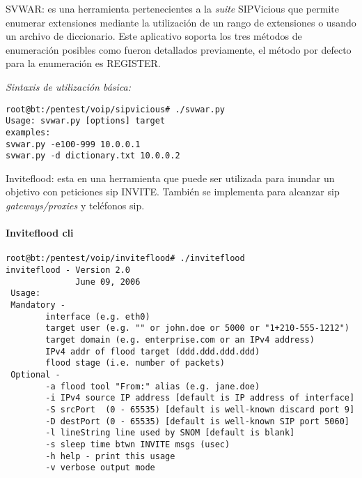 \documentclass[a4paper,12pt]{report}
\newenvironment{myscriptlisting}
{\begin{list}{}{\setlength{\leftmargin}{1em}}\item\scriptsize\bfseries}
{\end{list}}
\begin{document}
{\begin{itemize}
\item SVWAR: es una herramienta pertenecientes a la \emph{suite} SIPVicious que
permite enumerar extensiones mediante la utilización de un rango de extensiones
o usando un archivo de diccionario. Este aplicativo soporta los tres métodos de
enumeración posibles como fueron detallados previamente, el método por defecto
para la enumeración es \mbox{REGISTER}. 

\emph{Sintaxis de utilización básica:}
\begin{myscriptlisting}   
  \begin{verbatim}
root@bt:/pentest/voip/sipvicious# ./svwar.py
Usage: svwar.py [options] target
examples:
svwar.py -e100-999 10.0.0.1
svwar.py -d dictionary.txt 10.0.0.2
  \end{verbatim}
\end{myscriptlisting}

\item Inviteflood: esta en una herramienta que puede ser utilizada para inundar un objetivo con
peticiones \ac{sip} INVITE. También se implementa para alcanzar
\ac{sip} \emph{gateways/proxies} y teléfonos \ac{sip}.

\paragraph{Inviteflood cli}
\begin{myscriptlisting}   
  \begin{verbatim}
root@bt:/pentest/voip/inviteflood# ./inviteflood
inviteflood - Version 2.0
              June 09, 2006
 Usage:
 Mandatory -
        interface (e.g. eth0)
        target user (e.g. "" or john.doe or 5000 or "1+210-555-1212")
        target domain (e.g. enterprise.com or an IPv4 address)
        IPv4 addr of flood target (ddd.ddd.ddd.ddd)
        flood stage (i.e. number of packets)
 Optional -
        -a flood tool "From:" alias (e.g. jane.doe)
        -i IPv4 source IP address [default is IP address of interface]
        -S srcPort  (0 - 65535) [default is well-known discard port 9]
        -D destPort (0 - 65535) [default is well-known SIP port 5060]
        -l lineString line used by SNOM [default is blank]
        -s sleep time btwn INVITE msgs (usec)
        -h help - print this usage
        -v verbose output mode
  \end{verbatim}
\end{myscriptlisting}


\end{itemize}}
\end{document}
